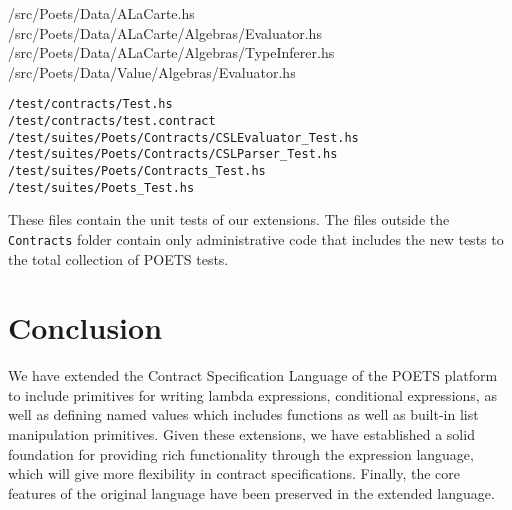 \documentclass[10pt,a4paper,final,oneside,openany,article]{memoir}
\begin{document}
/src/Poets/Data/ALaCarte.hs
/src/Poets/Data/ALaCarte/Algebras/Evaluator.hs
/src/Poets/Data/ALaCarte/Algebras/TypeInferer.hs
/src/Poets/Data/Value/Algebras/Evaluator.hs

\begin{verbatim}
/test/contracts/Test.hs
/test/contracts/test.contract
/test/suites/Poets/Contracts/CSLEvaluator_Test.hs
/test/suites/Poets/Contracts/CSLParser_Test.hs
/test/suites/Poets/Contracts_Test.hs
/test/suites/Poets_Test.hs
\end{verbatim}

These files contain the unit tests of our extensions. The files
outside the \verb+Contracts+ folder contain only administrative code
that includes the new tests to the total collection of POETS tests.

\chapter{Conclusion}
We have extended the Contract Specification Language of the POETS
platform to include primitives for writing lambda expressions,
conditional expressions, as well as defining named values which includes
functions as well as built-in list manipulation primitives. Given these
extensions, we have established a solid foundation for providing rich
functionality through the expression language, which will give more
flexibility in contract specifications.
Finally, the core features of the original language \cite[page
4]{hvitved10} have been preserved in the extended language.

\end{document}
